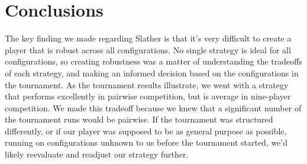 \section{Conclusions}
The key finding we made regarding Slather is that it’s very difficult to create a player that is robust across all configurations. No single strategy is ideal for all configurations, so creating robustness was a matter of understanding the tradeoffs of each strategy, and making an informed decision based on the configurations in the tournament. As the tournament results illustrate, we went with a strategy that performs excellently in pairwise competition, but is average in nine-player competition. We made this tradeoff because we knew that a significant number of the tournament runs would be pairwise. If the tournament was structured differently, or if our player was supposed to be as general purpose as possible, running on configurations unknown to us before the tournament started, we’d likely reevaluate and readjust our strategy further.

